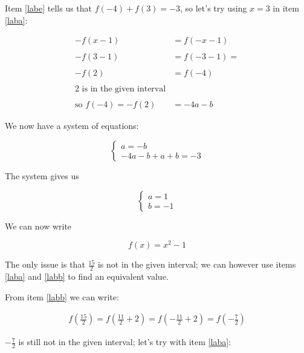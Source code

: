 \begin{enumerate}
Item \ref{labe} tells us that $f(-4)+f(3)=-3$, so let's try using $x=3$ in item \ref{laba}:

\begin{equation}
\begin{split}
-f(x-1)&=f(-x-1) \\
\\
-f(3-1)&=f(-3-1)= \\
\\
-f(2)&=f(-4) \\
\\
\textrm{2 is in the given interval}\\
\\
\textrm{so } f(-4)=-f(2)&=-4a-b
\end{split}
\end{equation}

We now have a system of equations:

\begin{equation}
\left\{
\begin{array}{ll}
a=-b \\
-4a-b+a+b=-3
\end{array}
\right.
\end{equation}

The system gives us 

\begin{equation}
\left\{
\begin{array}{ll}
a=1 \\
b=-1
\end{array}
\right.
\end{equation}

We can now write 

\begin{equation}
\label{equa}
f(x)=x^2-1
\end{equation}

The only issue is that $\frac{15}{2}$ is not in the given interval; we can however use items \ref{laba} and \ref{labb} to find an equivalent value.

From item \ref{labb} we can write: 

\begin{equation}
\begin{split}
f\left(\frac{15}{2}\right)=f\left(\frac{11}{2}+2\right)=f\left(-\frac{11}{2}+2\right)=f\left(-\frac{7}{2}\right)
\end{split}
\end{equation}

$-\frac{7}{2}$ is still not in the given interval; let's try with item \ref{laba}:


\end{enumerate}
